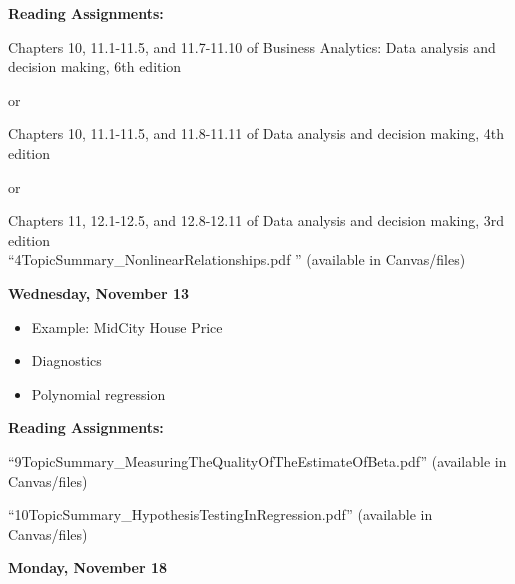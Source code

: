 \documentclass[11pt]{article}
\begin{document}
\noindent\textbf{Reading Assignments:}

Chapters 10, 11.1-11.5, and 11.7-11.10 of Business Analytics: Data analysis and decision making, 6th edition

or 

Chapters 10, 11.1-11.5, and 11.8-11.11 of Data analysis and decision making, 4th edition

or 

Chapters 11, 12.1-12.5, and 12.8-12.11 of  Data analysis and decision making, 3rd edition\\

 ``4TopicSummary\_NonlinearRelationships.pdf	'' (available in Canvas/files)


\vspace{5mm}
\noindent\textbf{\large Wednesday, November 13} 	

\begin{itemize}

\item Example: MidCity House Price
\item Diagnostics %
\item Polynomial regression


\end{itemize}

\noindent\textbf{Reading Assignments:}

 ``9TopicSummary\_MeasuringTheQualityOfTheEstimateOfBeta.pdf'' (available in Canvas/files)
 
 ``10TopicSummary\_HypothesisTestingInRegression.pdf'' (available in Canvas/files)




\vspace{5mm}

\noindent\textbf{\large Monday, November 18} 	

		
\end{document}
